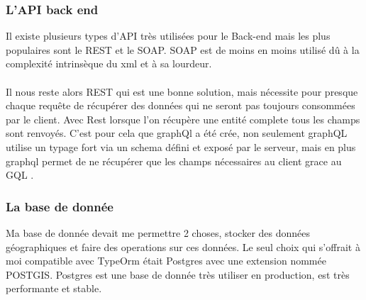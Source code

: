 \subsubsection{L'API back end}
Il existe plusieurs types d'API très utilisées pour le Back-end mais les plus populaires sont le REST et le SOAP\@.
SOAP est de moins en moins utilisé dû à la complexité intrinsèque du xml et à sa lourdeur.\\\\
Il nous reste alors REST qui est une bonne solution, mais nécessite pour presque chaque requête de récupérer des données qui ne seront pas toujours consommées par le client.
Avec Rest lorsque l'on récupère une entité complete tous les champs sont renvoyés.
C'est pour cela que graphQl a été crée, non seulement graphQL utilise un typage fort via un schema défini et exposé par le serveur,
mais en plus graphql permet de ne récupérer que les champs nécessaires au client grace au GQL .

\subsubsection{La base de donnée}
Ma base de donnée devait me permettre 2 choses, stocker des données géographiques et faire des operations sur ces données.
Le seul choix qui s'offrait à moi compatible avec TypeOrm était Postgres avec une extension nommée POSTGIS\@.
Postgres est une base de donnée très utiliser en production, est très performante et stable.

